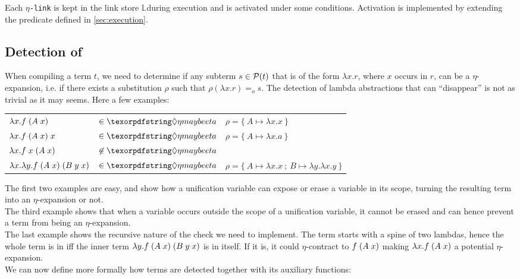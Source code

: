 \documentclass[sigconf,natbib=false,review]{acmart}
\newcommand{\appsep}{\ensuremath{\textcolor{lightgray}{\cdot}}}
\newcommand{\EqualRel}{\ensuremath{=}}
\newcommand{\Eo}{\ensuremath{\EqualRel_o}\xspace}
\newcommand{\linkMacro}[1]{\ensuremath{#1}\texttt{-link}\xspace}
\newcommand{\linketa} {\linkMacro{\eta}}
\newcommand{\linkStore}{\texorpdfstring{\ensuremath{\mathbb{L}}\xspace}{L}}
\begin{document}
Each \linketa is kept in the link store \linkStore during execution
and is activated under some conditions.
Activation is implemented by extending the 
predicate defined in \cref{sec:execution}.

\subsection{Detection of \maybeeta}\label{sec:etadetection}

When compiling a term $t$, we need to determine if any
subterm $s \in \mathcal{P}(t)$ that is of the form $\lambda x. r$,
where $x$ occurs in $r$, can be a $\eta$-expansion, i.e. if
there exists a substitution $\rho$ such that $\rho (\lambda x.r) \Eo s$.
The detection of lambda abstractions that can ``disappear''
is not as trivial as it may seems. Here a few examples:
%
\begin{center}
  \begin{tabular}{lll}
    $\lambda x. f \appsep (A \appsep x)$ & $\in\maybeeta$ & $\rho = \{~ A \mapsto \lambda x.x ~\}$ \\
    $\lambda x. f \appsep (A \appsep x) \appsep x$ & $\in\maybeeta$ & $\rho = \{~ A \mapsto \lambda x.a ~\}$\\
    $\lambda x. f \appsep x \appsep (A \appsep x)$ & $\not\in\maybeeta$ &\\
    $\lambda x. \lambda y. f \appsep (A \appsep x) \appsep (B \appsep y \appsep x)$ & $\in\maybeeta$ & $\rho = \{~ A \mapsto \lambda x.x~;~ B \mapsto \lambda y.\lambda x.y ~\}$
  \end{tabular}
\end{center}
\vspace{4pt}

\noindent
The first two examples are easy, and show how a unification variable can expose
or erase a variable in its scope, turning the resulting term into an $\eta$-expansion or not.\\
The third example shows that when a variable occurs outside the scope of a unification
variable, it cannot be erased and can hence prevent a term from being an $\eta$-expansion.\\
The last example shows the recursive nature of the check we need to implement.
The term starts with a spine of two lambdas, hence the whole term
is in \maybeeta iff the inner term $\lambda y.f\appsep (A \appsep x) \appsep (B \appsep y \appsep x)$
is in \maybeeta itself. If it is, it could $\eta$-contract to
$f \appsep (A \appsep x)$ making $\lambda x.f \appsep (A \appsep x)$ a potential
$\eta$-expansion.\\
We can now define more formally how \maybeeta terms are detected together with
its auxiliary functions:
\end{document}
